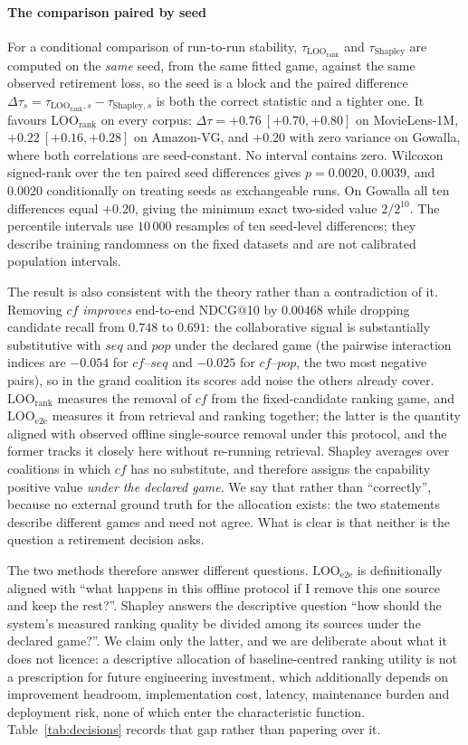 \documentclass[pdflatex,sn-basic,Numbered]{sn-jnl}
\theoremstyle{plain}
\theoremstyle{definition}
\newcommand{\LOOr}{\mathrm{LOO}_{\mathrm{rank}}}
\newcommand{\LOOe}{\mathrm{LOO}_{\mathrm{e2e}}}
\begin{document}
\paragraph{The comparison paired by seed}
For a conditional comparison of run-to-run stability, $\tau_{\LOOr}$ and
$\tau_{\text{Shapley}}$ are computed on the \emph{same} seed, from the same
fitted game, against the same observed retirement loss, so the seed is a block
and the paired difference $\Delta\tau_s = \tau_{\LOOr,s} -
\tau_{\text{Shapley},s}$ is both the correct statistic and a tighter one. It
favours $\LOOr$ on every corpus: $\Delta\tau = +0.76\ [+0.70, +0.80]$ on
MovieLens-1M, $+0.22\ [+0.16, +0.28]$ on Amazon-VG, and $+0.20$ with zero
variance on Gowalla, where both correlations are seed-constant. No interval
contains zero. Wilcoxon signed-rank over the ten paired seed differences gives
$p=0.0020$, $0.0039$, and $0.0020$ conditionally on treating seeds as
exchangeable runs. On Gowalla all ten differences equal $+0.20$, giving the
minimum exact two-sided value $2/2^{10}$. The percentile intervals use
$10\,000$ resamples of ten seed-level differences; they describe training
randomness on the fixed datasets and are not calibrated population intervals.

The result is also consistent with the theory rather than a contradiction of
it. Removing $cf$ \emph{improves} end-to-end NDCG@10 by $0.00468$ while
dropping candidate recall from $0.748$ to $0.691$: the collaborative signal is
substantially substitutive with $seq$ and $pop$ under the declared game (the pairwise interaction indices are $-0.054$ for $cf$--$seq$ and $-0.025$ for $cf$--$pop$, the two most negative pairs), so in the grand coalition its scores add noise the others
already cover. $\LOOr$ measures the removal of $cf$ from the fixed-candidate
ranking game, and $\LOOe$ measures it from retrieval and ranking together;
the latter is the quantity aligned with observed offline single-source removal
under this protocol, and the former tracks it closely here without re-running
retrieval. Shapley
averages over coalitions in which $cf$ has no substitute, and therefore assigns
the capability positive value \emph{under the declared game}. We say that
rather than ``correctly'', because no external ground truth for the allocation
exists: the two statements describe different games and need not agree. What is
clear is that neither is the question a retirement decision asks.

The two methods therefore answer different questions. $\LOOe$ is definitionally
aligned with ``what happens in this offline protocol if I remove this one source
and keep the rest?''.
Shapley answers the descriptive question ``how should the system's measured
ranking quality be divided among its sources under the declared game?''. We
claim only the latter, and we are deliberate about what it does not licence: a
descriptive allocation of baseline-centred ranking utility is not a prescription for future
engineering investment, which additionally depends on improvement headroom,
implementation cost, latency, maintenance burden and deployment risk, none of
which enter the characteristic function. Table~\ref{tab:decisions} records that
gap rather than papering over it.
\end{document}
